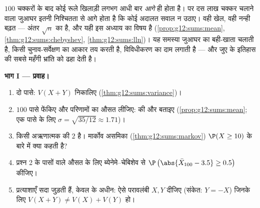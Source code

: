 \begin{problem}
\label{pb:g12:sums:1}
$100$ चक्करों के बाद कोई रूले खिलाड़ी लगभग आधी बार \emph{आगे} ही होता है। पर
दस लाख चक्कर चलाने वाला जुआघर इतनी निश्चितता से आगे होता है कि कोई अदालत सवाल
न उठाए। वही खेल, वही नन्ही बढ़त --- अंतर $\sqrt n$ का है, और यही इस अध्याय का
विषय है (\cref{prop:g12:sums:mean}, \cref{thm:g12:sums:chebyshev}, \cref{thm:g12:sums:lln})। यह समस्या जुआघर का बही-खाता चलाती है, किसी
चुनाव-सर्वेक्षण का आकार तय करती है, विविधीकरण का दाम लगाती है --- और जुए के
इतिहास की सबसे महँगी भ्रांति को ढहा देती है।

\medskip
\noindent\textbf{भाग I --- प्रवाह।}
\begin{enumerate}
  \item दो  पासे: $V(X + Y)$ निकालिए (\cref{thm:g12:sums:variance})।
  \item $100$  पासे फेंकिए और परिणामों का औसत लीजिए: 
        की  और  बताइए (\cref{prop:g12:sums:mean}; एक पासे के लिए $\sigma = \sqrt{35/12} \approx 1.71$)।
  \item किसी अऋणात्मक  की  $2$ है। मार्कोव असमिका
        (\cref{thm:g12:sums:markov}) $\P(X \geq 10)$ के बारे में क्या कहती है?
  \item प्रश्न 2 के पासों वाले औसत के लिए ब्येनेमे--चेबिशेव से $\P\left(\abs{\bar X_{100} - 3.5} \geq
        0.5\right)$ 
        कीजिए।
  \item प्रत्याशाएँ सदा जुड़ती हैं,  केवल  के अधीन: ऐसे
        परावलंबी $X, Y$ दीजिए (संकेत: $Y = -X$) जिनके लिए $V(X + Y) \neq V(X) + V(Y)$ हो।
\end{enumerate}


\end{problem}
